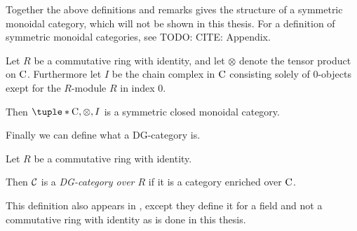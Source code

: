 Together the above definitions and remarks gives the structure of a symmetric monoidal category, which will not be shown in this thesis. For a definition of symmetric monoidal categories, see TODO: CITE: Appendix.

\begin{fact}
    Let \( R \) be a commutative ring with identity, and let \( \otimes \) denote the tensor product on \( \operatorname{C} \). Furthermore let \( I \) be the chain complex in \( \operatorname{C} \) consisting solely of \( 0 \)-objects exept for the \( R \)-module \( R \) in index \( 0 \).

    Then \( \tuple*{\C, \otimes, I} \) is a symmetric closed monoidal category.
\end{fact}

Finally we can define what a DG-category is.

\begin{definition}[DG-category]
    \label{def:dg_cat}
    Let \( R \) be a commutative ring with identity.

    Then \( {\mathcal{C}} \) is a \emph{DG-category over \( R \)} if it is a category enriched over \( \operatorname{C} \).
\end{definition}

This definition also appears in \cite[p. 29]{Jasso-Muro_2023}, except they define it for a field and not a commutative ring with identity as is done in this thesis.
